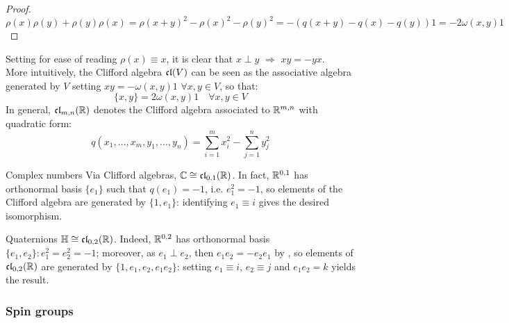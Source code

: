 \begin{proofbox}
  \begin{proof}
    \begin{equation*}
      \rho(x) \rho(y) + \rho(y) \rho(x) = \rho(x + y)^2 - \rho(x)^2 - \rho(y)^2 = - \left( q(x + y) - q(x) - q(y) \right) \mathit{1} = - 2 \omega(x,y) \mathit{1}
    \end{equation*}
  \end{proof}
\end{proofbox}

Setting for ease of reading $ \rho(x) \equiv x $, it is clear that $ x \perp y \,\,\Rightarrow\,\, xy = -yx $.\\
More intuitively, the Clifford algebra $ \mathfrak{cl}(V) $ can be seen as the associative algebra generated by $ V $ setting $ xy = - \omega(x,y)\mathit{1} \,\,\forall x,y \in V$, so that:
\begin{equation}
  \{x,y\} = 2 \omega(x,y)\mathit{1} \quad \forall x,y \in V
  \label{eq:cliff-alg}
\end{equation}
In general, $ \mathfrak{cl}_{m,n}(\mathbb{R}) $ denotes the Clifford algebra associated to $ \mathbb{R}^{m,n} $ with quadratic form:
\begin{equation*}
  q(x_1,\dots,x_m,y_1,\dots,y_n) = \sum_{i = 1}^{m} x_i^2 - \sum_{j = 1}^{n} y_j^2
\end{equation*}

\begin{example}{Complex numbers}{}
  Via Clifford algebras, $ \mathbb{C} \cong \mathfrak{cl}_{0,1}(\mathbb{R}) $. In fact, $ \mathbb{R}^{0,1} $ has orthonormal basis $ \{e_1\} $ such that $ q(e_1) = -1 $, i.e. $ e_1^2 = - \mathit{1} $, so elements of the Clifford algebra are generated by $ \{\mathit{1},e_1\} $: identifying $ e_1 \equiv i $ gives the desired isomorphism.
\end{example}

\begin{example}{Quaternions}{}
  $ \mathbb{H} \cong \mathfrak{cl}_{0,2}(\mathbb{R}) $. Indeed, $ \mathbb{R}^{0,2} $ has orthonormal basis $ \{e_1,e_2\} : e_1^2 = e_2^2 = - \mathit{1} $; moreover, as $ e_1 \perp e_2 $, then $ e_1 e_2 = - e_2 e_1 $ by , so elements of $ \mathfrak{cl}_{0,2}(\mathbb{R}) $ are generated by $ \{\mathit{1},e_1,e_2,e_1 e_2\} $: setting $ e_1 \equiv i $, $ e_2 \equiv j $ and $ e_1 e_2 = k $ yields the result.
\end{example}

\subsubsection{Spin groups}
\label{subsubsec:spin-groups}

